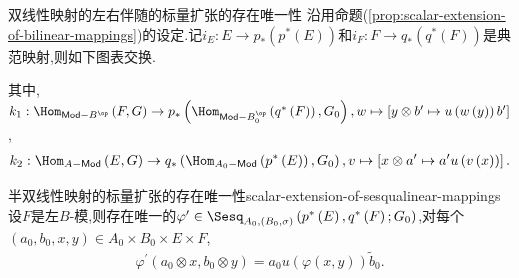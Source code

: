 \begin{proposition}{双线性映射的左右伴随的标量扩张的存在唯一性}{}
	沿用命题(\ref{prop:scalar-extension-of-bilinear-mappings})的设定.记$i_{E}:E\to p_{\ast}\left(p^{\ast}\left(E\right)\right)$和$i_{F}:F\to q_{\ast}\left(q^{\ast}\left(F\right)\right)$是典范映射,则如下图表交换.
	\begin{center}
	\end{center}
	其中,$k_{1}:\Hom_{\mathsf{Mod}-B^{\op}}\left(F,G\right)\to p_{\ast}\left(\Hom_{\mathsf{Mod}-B_{0}^{\op}}\left(q^{\ast}\left(F\right)\right),G_{0}\right),w\mapsto\left[y\otimes b^{\prime}\mapsto u\left(w\left(y\right)\right)b^{\prime}\right]$,
	\begin{align*}
		k_{2}:\Hom_{A-\mathsf{Mod}}\left(E,G\right)\to q_{\ast}\left(\Hom_{A_{0}-\mathsf{Mod}}\left(p^{\ast}\left(E\right)\right),G_{0}\right),v\mapsto\left[x\otimes a^{\prime}\mapsto  a^{\prime}u\left(v\left(x\right)\right)\right].
	\end{align*}
\end{proposition}

\begin{proposition}{半双线性映射的标量扩张的存在唯一性}{scalar-extension-of-sesqualinear-mappings}
	设$F$是左$B$-模,则存在唯一的$\varphi^{\prime}\in\Sesq_{A_{0},(B_{0},\sigma)}\left(p^{\ast}\left(E\right),q^{\ast}\left(F\right);G_{0}\right)$,对每个$\left(a_{0},b_{0},x,y\right)\in A_{0}\times B_{0}\times E\times F$,
	\begin{align*}
		\varphi^{\prime}\left(a_{0}\otimes x,b_{0}\otimes y\right)=a_{0}u\left(\varphi\left(x,y\right)\right)\tilde{b}_{0}.
	\end{align*}
\end{proposition}

